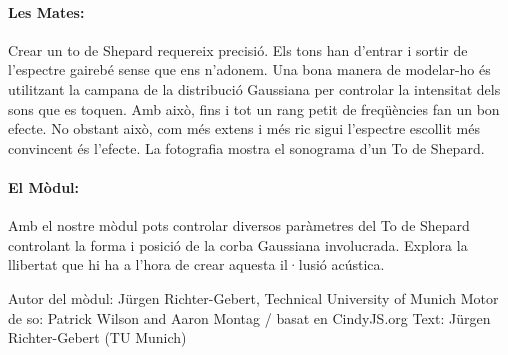 \paragraph{Les Mates:}Crear un to de Shepard requereix precisió. Els tons han d'entrar i  sortir de l'espectre gairebé sense que ens n'adonem. Una bona manera de modelar-ho és utilitzant la campana de la distribució Gaussiana per controlar la intensitat dels sons que es toquen. Amb això, fins i tot un rang petit de freqüències fan un bon efecte. No obstant això, com més extens i més ric sigui l'espectre escollit més convincent és l'efecte. La fotografia mostra el sonograma d'un To de Shepard.

\paragraph{El Mòdul:}Amb el nostre mòdul pots controlar diversos paràmetres del To de Shepard controlant la forma i posició de la corba Gaussiana involucrada. Explora la llibertat que hi ha a l'hora de crear aquesta il·lusió acústica. 

\vfill

Autor del mòdul: Jürgen Richter-Gebert, Technical University of Munich 
Motor de so: Patrick Wilson and Aaron Montag / basat en CindyJS.org
Text: Jürgen Richter-Gebert (TU Munich)\\
